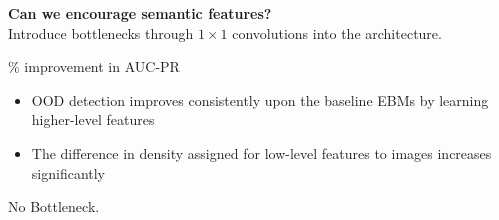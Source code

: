 \documentclass[landscape,a0paper,fontscale=0.292]{baposter}
\begin{document}
\begin{poster}
{\begin{minipage}[t]{.48\linewidth}
        \vspace{1em}

        \textbf{\color{blue}Can we encourage semantic features?} \\
        Introduce bottlenecks through \(1 \times 1\) convolutions into the architecture.
        \begin{center}
        \resizebox{0.5\textwidth}{!}{
        
        }
        \vspace{0.5em}

        \% improvement in AUC-PR
        \end{center}
        \begin{itemize}
            \item OOD detection improves consistently upon the baseline EBMs by learning higher-level features
            \item The difference in density assigned for low-level features to images increases significantly
        \end{itemize}
        \vspace{2mm}
        \begin{minipage}[b]{0.5\linewidth}
            \begin{center}
            No Bottleneck.
            \end{center}
        \end{minipage}%
        \hfill
        \begin{minipage}[b]{0.5\linewidth}
            \begin{center}

\end{center}
\end{minipage}
\end{minipage}}
\end{poster}
\end{document}
